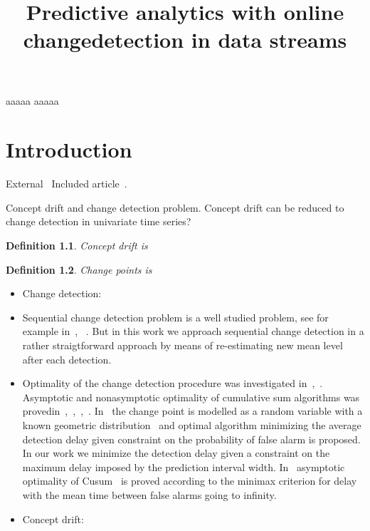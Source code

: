 \documentclass[licentiate,utf8,lot,loar,lof,shortloft,index]{jydiss}
\title{Predictive analytics with online changedetection in data streams}
\newtheorem{definition}{Definition}
\begin{document}
\preface
{} aaaaa
\acknowledgements
aaaaa
\mainmatter

\chapter{Introduction}
External~\cite{shewhart1931economic}
Included article~\cite{sha1}.

Concept drift and change detection problem.
Concept drift can be reduced to change detection in univariate time series?

\begin{definition}
  Concept drift is
\end{definition}

\begin{definition}
  Change points is
\end{definition}

\begin{itemize}
  \item Change detection:~\cite{basseville1993detection}
  
  \item Sequential change detection problem is a well studied problem, see for example in~\cite{tartakovsky2014sequential}, ~\cite{plasse2021streaming}. But in this work we approach sequential change detection in a rather straigtforward approach by means of re-estimating new mean level after each detection.
  
  \item Optimality of the change detection procedure was investigated in~\cite{Page1954},~\cite{Shiryaev2010,Shiryaev1961,Shiryaev1963}.
  Asymptotic and nonasymptotic optimality of cumulative sum algorithms was provedin~\cite{lorden1971procedures},~\cite{moustakides1986optimal},~\cite{moustakides2004optimality},~\cite{ritov1990decision}. In~\cite{Shiryaev1963,shiryaev2007optimal} the change point is modelled as a random variable with a known geometric distribution~\cite{veeravalli2014quickest} and optimal algorithm minimizing the average detection delay given constraint on the probability of false alarm is proposed. In our work we minimize the detection delay given a constraint on the maximum delay imposed by the prediction interval width. In~\cite{lorden1971procedures} asymptotic optimality of Cusum~\cite{Page1954} is proved according to the minimax criterion for delay with the mean time between false alarms going to infinity.
  
  \item Concept drift:
\end{itemize}
\end{document}

